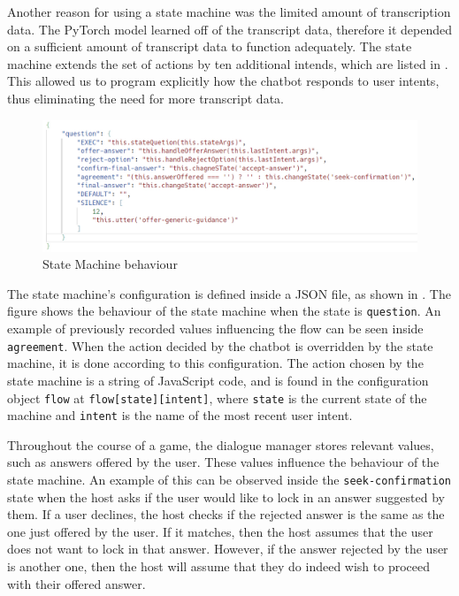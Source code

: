 \documentclass[hidelinks, 11pt]{article}
\begin{document}
Another reason for using a state machine was the limited amount of transcription data. The PyTorch model learned off of the transcript data, therefore it depended on a sufficient amount of transcript data to function adequately. The state machine extends the set of actions by ten additional intends, which are listed in . This allowed us to program explicitly how the chatbot responds to user intents, thus eliminating the need for more transcript data.

\begin{figure}[h!]
  \includegraphics[width=\columnwidth]{images/jacks_figure.png}
  \caption{State Machine behaviour}
  \label{fig:jacks_figure}
\end{figure}

The state machine's configuration is defined inside a JSON file, as shown in . The figure shows the behaviour of the state machine when the state is \verb|question|. An example of previously recorded values influencing the flow can be seen inside \verb|agreement|. When the action decided by the chatbot is overridden by the state machine, it is done according to this configuration. The action chosen by the state machine is a string of JavaScript code, and is found in the configuration object \verb|flow| at \verb|flow[state][intent]|, where \verb|state| is the current state of the machine and \verb|intent| is the name of the most recent user intent.

Throughout the course of a game, the dialogue manager stores relevant values, such as answers offered by the user. These values influence the behaviour of the state machine. An example of this can be observed inside the \verb|seek-confirmation| state when the host asks if the user would like to lock in an answer suggested by them. If a user declines, the host checks if the rejected answer is the same as the one just offered by the user. If it matches, then the host assumes that the user does not want to lock in that answer. However, if the answer rejected by the user is another one, then the host will assume that they do indeed wish to proceed with their offered answer.
\end{document}
